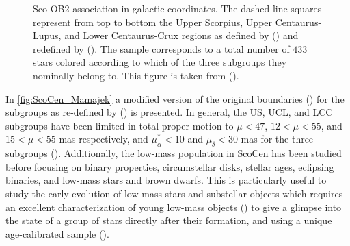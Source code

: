 \begin{figure}[!ht]
\centering
\caption{\scriptsize{ Sco OB2 association in galactic coordinates. The dashed-line squares represent from top to bottom the Upper Scorpius, Upper Centaurus-Lupus, and Lower Centaurus-Crux regions as defined by  (\citeyear{Blaauw46}) and redefined by  (\citeyear{1999AJ....117..354D}). The sample corresponds to a total number of $433$ stars colored according to which of the three subgroups they nominally belong to. This figure is taken from  (\citeyear{2018MNRAS.tmp..210W}).}}
\label{fig:ScoCen_Mamajek}
\end{figure}

In \autoref{fig:ScoCen_Mamajek} a modified version of the original boundaries  (\citeyear{Blaauw46}) for the subgroups as re-defined by  (\citeyear{1999AJ....117..354D}) is presented. In general, the US, UCL, and LCC subgroups have been limited in total proper motion to $\mu < 47$, $12 < \mu < 55$, and $15 < \mu < 55$ mas respectively, and $\mu^*_\alpha < 10$ and $\mu_\delta < 30$ mas for the three subgroups  (\citeyear{2016MNRAS.461..794P}). Additionally, the low-mass population in ScoCen has been studied before focusing on binary properties, circumstellar disks, stellar ages, eclipsing binaries, and low-mass stars and brown dwarfs. This is particularly useful to study the early evolution of low-mass stars and substellar objects which requires an excellent characterization of young low-mass objects  (\citeyear{2018arXiv180200878M}) to give a glimpse into the state of a group of stars directly after their formation, and using a unique age-calibrated sample  (\citeyear{2015yCat..74163108R}).  

